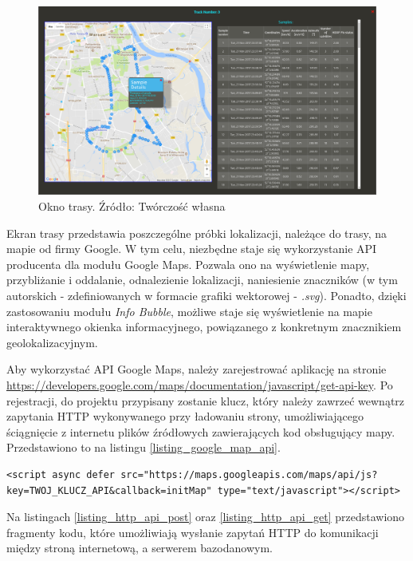 \begin{figure}[H]
	\centering
	\includegraphics[width=18cm]{img/software/website/track_modal.png}
	\caption{Okno trasy. Źródło: Twórczość własna}
	\label{fig:image_soft_website_track_map}
\end{figure}

\clearpage
Ekran trasy przedstawia poszczególne próbki lokalizacji, należące do trasy, na mapie od firmy Google. W tym celu, niezbędne staje się wykorzystanie API producenta dla modułu Google Maps. Pozwala ono na wyświetlenie mapy, przybliżanie i oddalanie, odnalezienie lokalizacji, naniesienie znaczników (w tym autorskich - zdefiniowanych w formacie grafiki wektorowej - \textit{.svg}). Ponadto, dzięki zastosowaniu modułu \textit{Info Bubble}, możliwe staje się wyświetlenie na mapie interaktywnego okienka informacyjnego, powiązanego z konkretnym znacznikiem geolokalizacyjnym.

Aby wykorzystać API Google Maps, należy zarejestrować aplikację na stronie \url{https://developers.google.com/maps/documentation/javascript/get-api-key}. Po rejestracji, do projektu przypisany zostanie klucz, który należy zawrzeć wewnątrz zapytania HTTP wykonywanego przy ładowaniu strony, umożliwiającego ściągnięcie z internetu plików źródłowych zawierających kod obsługujący mapy. Przedstawiono to na listingu \ref{listing_google_map_api}.

\begin{lstlisting}[label=listing_google_map_api, caption=Fragment kodu pozwalający na użycie API Google Maps]
<script async defer src="https://maps.googleapis.com/maps/api/js?key=TWOJ_KLUCZ_API&callback=initMap" type="text/javascript"></script>
\end{lstlisting}

Na listingach \ref{listing_http_api_post} oraz \ref{listing_http_api_get} przedstawiono fragmenty kodu, które umożliwiają wysłanie zapytań HTTP do komunikacji między stroną internetową, a serwerem bazodanowym.

